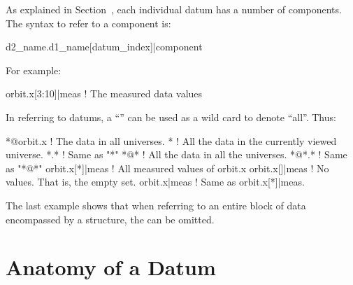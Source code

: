 As explained in Section~, each individual datum
has a number of components. The syntax to refer to a component is:
\begin{example}
  d2_name.d1_name[datum_index]|component
\end{example}
For example:
\begin{example}
  orbit.x[3:10]|meas     ! The measured data values
\end{example}

In referring to datums, a ``\vn{*}'' can be used as a wild card to 
denote ``all''. Thus:
\begin{example}
  *@orbit.x       ! The  data in all universes.
  *               ! All the data in the currently viewed universe.
  *.*             ! Same as "*"
  *@*             ! All the data in all the universes. 
  *@*.*           ! Same as "*@*"
  orbit.x[*]|meas ! All measured values of orbit.x
  orbit.x[]|meas  ! No values. That is, the empty set.
  orbit.x|meas    ! Same as orbit.x[*]|meas.
\end{example}
The last example shows that when referring to an entire block of data
encompassed by a  structure, the \vn{[*]} can be omitted.


\section{Anatomy of a Datum}
\label{s:data.anatomy}

